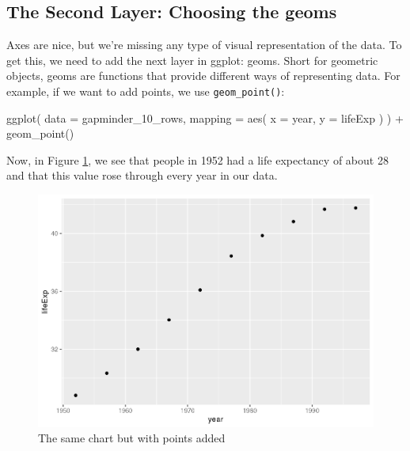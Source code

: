 \documentclass[
]{book}
\newenvironment{Shaded}{\begin{snugshade}}{\end{snugshade}}
\newcommand{\AttributeTok}[1]{\textcolor[rgb]{0.77,0.63,0.00}{#1}}
\newcommand{\FunctionTok}[1]{\textcolor[rgb]{0.00,0.00,0.00}{#1}}
\newcommand{\NormalTok}[1]{#1}
\newcommand{\SpecialCharTok}[1]{\textcolor[rgb]{0.00,0.00,0.00}{#1}}
\begin{document}
\hypertarget{the-second-layer-choosing-the-geoms}{%
\subsection*{The Second Layer: Choosing the geoms}\label{the-second-layer-choosing-the-geoms}}

Axes are nice, but we're missing any type of visual representation of the data. To get this, we need to add the next layer in ggplot: geoms. Short for geometric objects, geoms are functions that provide different ways of representing data. For example, if we want to add points, we use \texttt{geom\_point()}:

\begin{Shaded}
\begin{Highlighting}[]
\FunctionTok{ggplot}\NormalTok{(}
  \AttributeTok{data =}\NormalTok{ gapminder\_10\_rows,}
  \AttributeTok{mapping =} \FunctionTok{aes}\NormalTok{(}
    \AttributeTok{x =}\NormalTok{ year,}
    \AttributeTok{y =}\NormalTok{ lifeExp}
\NormalTok{  )}
\NormalTok{) }\SpecialCharTok{+}
  \FunctionTok{geom\_point}\NormalTok{()}
\end{Highlighting}
\end{Shaded}

Now, in Figure \ref{fig:gapminder-points-plot}, we see that people in 1952 had a life expectancy of about 28 and that this value rose through every year in our data.

\begin{figure}
\includegraphics[width=1\linewidth]{data-viz_files/figure-latex/gapminder-points-plot-1} \caption{The same chart but with points added}\label{fig:gapminder-points-plot}
\end{figure}
\end{document}
